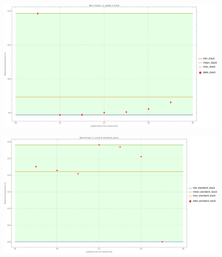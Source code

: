 \begin{figure}[H]
  \centering
  \includegraphics[width=1.0\textwidth]{../../resources/benchmark_2_4.png}
  \caption{}
\end{figure}
\begin{figure}[H]
  \centering
  \includegraphics[width=1.0\textwidth]{../../resources/benchmark_2_5.png}
  \caption{}
\end{figure}

